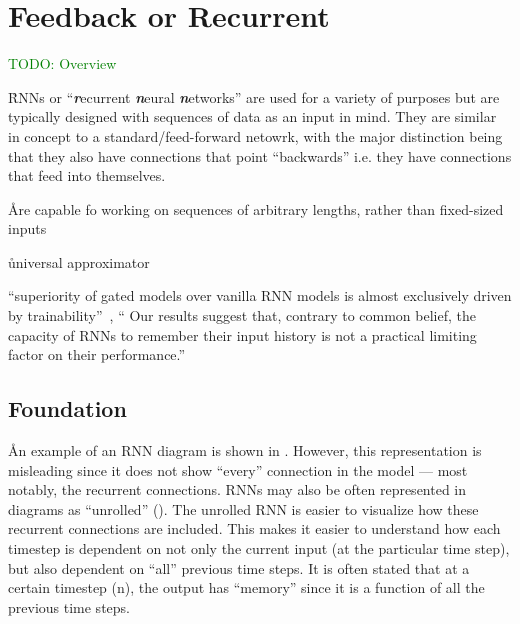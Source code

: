 \section{Feedback or Recurrent}

\textcolor{green}{TODO: Overview}

\r{RNNs or ``\textit{\textbf{r}}ecurrent \textit{\textbf{n}}eural \textit{\textbf{n}}etworks'' are used for a variety of purposes but are typically designed with sequences of data as an input in mind. They are similar in concept to a standard/feed-forward netowrk, with the major distinction being that they also have connections that point ``backwards'' i.e. they have connections that feed into themselves.}

\r{Are capable fo working on sequences of arbitrary lengths, rather than fixed-sized inputs}

\r{universal approximator~\cite{doya1993universality}}

\r{``superiority of gated models over vanilla RNN models is almost exclusively driven by trainability''~\cite{Collins2017CapacityAT}, `` Our results suggest that, contrary to common
	belief, the capacity of RNNs to remember their input history is not a practical limiting factor on their
	performance.'' ~\cite{Collins2017CapacityAT}}




\subsection{Foundation}

\r{An example of an RNN diagram is shown in . However, this representation is misleading since it does not show ``every'' connection in the model --- most notably, the recurrent connections.  RNNs may also be often represented in diagrams as ``unrolled'' (). The unrolled RNN is easier to visualize how these recurrent connections are included.  This makes it easier to understand how each timestep is dependent on not only the current input (at the particular time step), but also dependent on ``all'' previous time steps. It is often stated that at a certain timestep (n), the output has ``memory'' since it is a function of all the previous time steps.}


